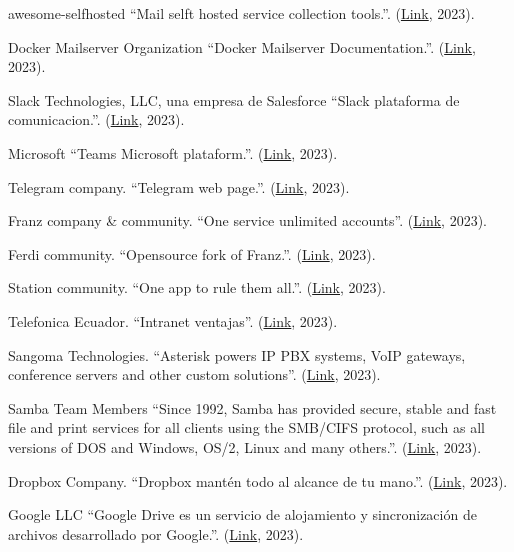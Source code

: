 \documentclass[spanish,final]{setup/eetac_tfc_pfc}
\begin{document}
\begin{thebibliography}{2}
awesome-selfhosted
``Mail selft hosted service collection tools.''.
(\href{https://github.com/awesome-selfhosted/awesome-selfhosted##communication---email---complete-solutions}{Link}, 2023).

 Docker Mailserver Organization
``Docker Mailserver Documentation.''.
(\href{https://docker-mailserver.github.io/docker-mailserver/edge/}{Link}, 2023).

Slack Technologies, LLC, una empresa de Salesforce
``Slack plataforma de comunicacion.''.
(\href{https://slack.com/intl/es-es}{Link}, 2023).

Microsoft
``Teams Microsoft plataform.''.
(\href{hhttps://www.microsoft.com/es/microsoft-teams/group-chat-software/}{Link}, 2023).

Telegram company.
``Telegram web page.''.
(\href{https://telegram.org/}{Link}, 2023).

Franz company \& community.
``One service unlimited accounts''.
(\href{https://meetfranz.com/}{Link}, 2023).

Ferdi community.
``Opensource fork of Franz.''.
(\href{https://opencollective.com/getferdi}{Link}, 2023).

Station community.
``One app to rule them all.''.
(\href{https://getstation.com/}{Link}, 2023).

Telefonica Ecuador.
``Intranet ventajas''.
(\href{https://empresas.blogthinkbig.com/intranet-una-manera-efectiva-de-encarar-la-comunicacion-interna}{Link}, 2023).

 Sangoma Technologies.
``Asterisk powers IP PBX systems, VoIP gateways, conference servers and other custom solutions''.
(\href{https://www.asterisk.org/}{Link}, 2023).

Samba Team Members
``Since 1992, Samba has provided secure, stable and fast file and print services for all clients using the SMB/CIFS protocol, such as all versions of DOS and Windows, OS/2, Linux and many others.''.
(\href{https://www.samba.org/}{Link}, 2023).

Dropbox Company.
``Dropbox mantén todo al alcance de tu mano.''.
(\href{https://www.dropbox.com/}{Link}, 2023).

Google LLC
``Google Drive es un servicio de alojamiento y sincronización de archivos desarrollado por Google.''.
(\href{https://drive.google.com/}{Link}, 2023).


\end{thebibliography}
\end{document}
